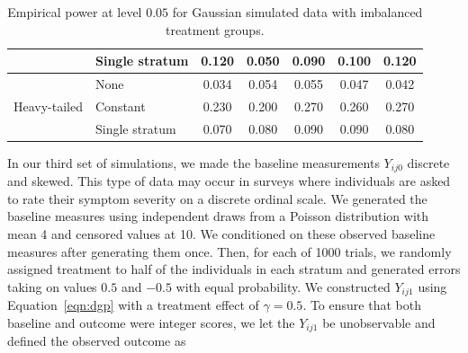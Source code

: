 \documentclass[12pt]{article}
\begin{document}
\begin{table}[ht]
\begin{tabular}{ll|ccccc}
                              & Single stratum                                              & 0.120                      & 0.050                                                                                & 0.090                                                                                 & 0.100                                                                        & 0.120                                                                        \\ \hline
\multirow{3}{*}{Heavy-tailed} & None                                                        & 0.034                      & 0.054                                                                                & 0.055                                                                                 & 0.047                                                                        & 0.042                                                                        \\
                              & Constant                                                    & 0.230                      & 0.200                                                                                & 0.270                                                                                 & 0.260                                                                        & 0.270                                                                        \\
                              & Single stratum                                              & 0.070                      & 0.080                                                                                & 0.090                                                                                 & 0.090                                                                        & 0.080                                                                        \\ \hline
\end{tabular}
\caption{Empirical power at level $0.05$ for Gaussian simulated data with imbalanced treatment groups.} 
\label{tab:imbalanced_power}
\end{table}

In our third set of simulations, we made the baseline measurements $Y_{ij0}$ discrete and skewed.
This type of data may occur in surveys where individuals are asked to rate their symptom severity on a discrete ordinal scale.
We generated the baseline measures using independent draws from a Poisson distribution with mean 4 and censored values at 10.
We conditioned on these observed baseline measures after generating them once.
Then, for each of 1000 trials, we randomly assigned treatment to half of the individuals in each stratum and generated errors taking on values $0.5$ and $-0.5$ with equal probability.
We constructed $Y_{ij1}$ using Equation~\ref{eqn:dgp} with a treatment effect of $\gamma = 0.5$.
To ensure that both baseline and outcome were integer scores, we let the $Y_{ij1}$ be unobservable and defined the observed outcome as
\end{document}
